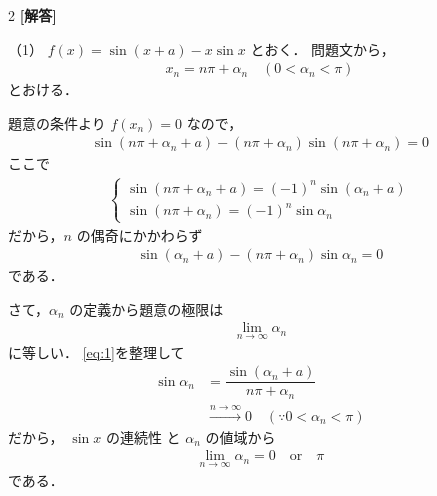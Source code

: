 \documentclass[../../main.tex]{subfiles}
\begin{document}
\setcounter{equation}{0}
\begin{oframed}
  
\end{oframed}
\setlength{\columnseprule}{0.4pt}
\begin{multicols}{2}
  {\bf [解答]}

  （1）
  $f(x) = \sin(x+a) - x\sin x$ とおく．
  問題文から，
  \begin{align}
    x_n = n\pi+\alpha_n \quad (0<\alpha_n<\pi)
  \end{align}
  とおける．

  題意の条件より $f(x_n)=0$ なので，
  \begin{align}
    \sin (n\pi+\alpha_n+a) - (n\pi+\alpha_n) \sin (n\pi + \alpha_n) = 0
  \end{align}
  ここで
  \begin{align}
    \begin{cases}
      \sin (n\pi+\alpha_n+a) = (-1)^n \sin (\alpha_n+a) \\
      \sin (n\pi+\alpha_n)   = (-1)^n \sin \alpha_n
    \end{cases}
  \end{align}
  だから，$n$ の偶奇にかかわらず
  \begin{align}
    \sin (\alpha_n+a) - (n\pi+\alpha_n) \sin \alpha_n = 0 \label{eq:1}
  \end{align}
  である．

  さて，$\alpha_n$ の定義から題意の極限は
  \begin{align}
    \lim_{n\to\infty} \alpha_n
  \end{align}
  に等しい．
  \cref{eq:1}を整理して
  \begin{align}
    \sin \alpha_n
    & = \dfrac{\sin(\alpha_n+a)}{n\pi+\alpha_n}                                        \\
    & \xrightarrow{n\to\infty} 0 \quad (\because 0<\alpha_n<\pi)  \label{eq:2}
  \end{align}
  だから， $\sin x$ の連続性 と $\alpha_n$ の値域から
  \begin{align}
    \lim_{n\to\infty} \alpha_n = 0 \quad \text{or} \quad \pi  \label{eq:3}
  \end{align}
  である．


\end{multicols}
\end{document}
